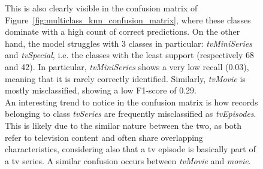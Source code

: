 \begin{figure}[H]
    \centering
    \begin{minipage}[t]{0.59\textwidth}
        \vspace{0pt}
        \small
        This is also clearly visible in the confusion matrix of Figure~\ref{fig:multiclass_knn_confusion_matrix}, where these classes dominate with a high count of correct predictions. 
        On the other hand, the model struggles with 3 classes in particular: \textit{tvMiniSeries} and \textit{tvSpecial}, i.e. the classes with the least support (respectively 68 and 42). 
        In particular, \textit{tvMiniSeries} shows a very low recall (0.03), meaning that it is rarely correctly identified. 
        Similarly, \textit{tvMovie} is mostly misclassified, showing a low F1-score of 0.29.\\
        
        An interesting trend to notice in the confusion matrix is how records belonging to class \textit{tvSeries} are frequently misclassified as \textit{tvEpisodes}. 
        This is likely due to the similar nature between the two, as both refer to television content and often share overlapping characteristics, considering also that a tv episode is basically part of a tv series. 
        A similar confusion occurs between \textit{tvMovie} and \textit{movie}.\\


\end{minipage}
\end{figure}
